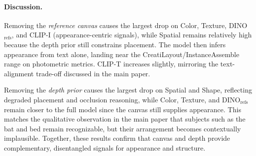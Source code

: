 \documentclass[runningheads]{llncs}
\begin{document}
\begin{table}[t]
  \centering
  \caption{Ablation study evaluating the contributions of the reference canvas and depth prior.
  The full model consistently achieves the best performance across identity preservation, spatial arrangement, and semantic alignment metrics.}
  \label{tab:ablation}
\end{table}

\paragraph{Discussion.}
Removing the \emph{reference canvas} causes the largest drop on Color, Texture, DINO$_{\text{refs}}$, and CLIP-I (appearance-centric signals), while Spatial remains relatively high because the depth prior still constrains placement.
The model then infers appearance from text alone, landing near the CreatiLayout/InstanceAssemble~\cite{tang2024creatilayout,xiang2025instanceassemble} range on photometric metrics.
CLIP-T increases slightly, mirroring the text-alignment trade-off discussed in the main paper.

Removing the \emph{depth prior} causes the largest drop on Spatial and Shape, reflecting degraded placement and occlusion reasoning, while Color, Texture, and DINO$_{\text{refs}}$ remain closer to the full model since the canvas still supplies appearance.
This matches the qualitative observation in the main paper that subjects such as the bat and bed remain recognizable, but their arrangement becomes contextually implausible.
Together, these results confirm that canvas and depth provide complementary, disentangled signals for appearance and structure.
\end{document}
